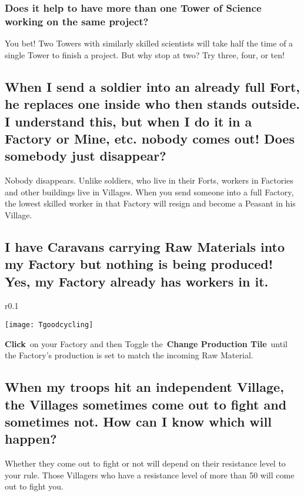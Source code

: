 \subsubsection{Does it help to have more than one Tower of Science working on the same project?}

You bet! Two Towers with similarly skilled scientists will take half the time of a single Tower to finish a project. But why stop at two? Try three, four, or ten!

\subsection{When I send a soldier into an already full Fort, he replaces one inside who then stands outside. I understand this, but when I do it in a Factory or Mine, etc. nobody comes out! Does somebody just disappear?}

Nobody disappears. Unlike soldiers, who live in their Forts, workers in Factories and other buildings live in Villages. When you send someone into a full Factory, the lowest skilled worker in that Factory will resign and become a Peasant in his Village.

\subsection{I have Caravans carrying Raw Materials into my Factory but nothing is being produced! Yes, my Factory already has workers in it.}

\begin{wrapfigure}{r}{0.1\textwidth}
	\vspace{-20pt}
	\begin{center}
		\texttt{[image: Tgoodcycling]}
	\end{center}
	\vspace{-20pt}
\end{wrapfigure}

\textbf{Click} on your Factory and then Toggle the \textbf{Change Production Tile} until the Factory’s production is set to match the incoming Raw Material.

\subsection{When my troops hit an independent Village, the Villages sometimes come out to fight and sometimes not. How can I know which will happen?}

Whether they come out to fight or not will depend on their resistance level to your rule. Those Villagers who have a resistance level of more than 50 will come out to fight you.

